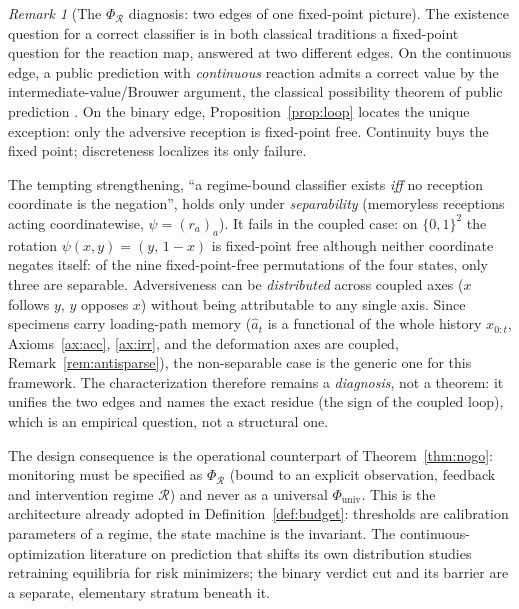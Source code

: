 \documentclass[11pt]{article}
\theoremstyle{plain}
\theoremstyle{definition}
\theoremstyle{remark}
\newtheorem{remark}[theorem]{Remark}
\begin{document}
\begin{remark}[The $\Phi_{\mathcal R}$ diagnosis: two edges of one fixed-point picture]\label{rem:phir}
The existence question for a correct classifier is in both classical traditions a fixed-point question for the reaction map, answered at two different edges. On the continuous edge, a public prediction with \emph{continuous} reaction admits a correct value by the intermediate-value/Brouwer argument, the classical possibility theorem of public prediction \citep{grunbergmodigliani1954,simon1954}. On the binary edge, Proposition~\ref{prop:loop} locates the unique exception: only the adversive reception is fixed-point free. Continuity buys the fixed point; discreteness localizes its only failure.

The tempting strengthening, ``a regime-bound classifier exists \emph{iff} no reception coordinate is the negation'', holds only under \emph{separability} (memoryless receptions acting coordinatewise, $\psi=(r_a)_{a}$). It fails in the coupled case: on $\{0,1\}^2$ the rotation $\psi(x,y)=(y,\,1{-}x)$ is fixed-point free although neither coordinate negates itself: of the nine fixed-point-free permutations of the four states, only three are separable. Adversiveness can be \emph{distributed} across coupled axes ($x$ follows $y$, $y$ opposes $x$) without being attributable to any single axis. Since specimens carry loading-path memory ($\hat a_t$ is a functional of the whole history $x_{0:t}$, Axioms~\ref{ax:acc}, \ref{ax:irr}, and the deformation axes are coupled, Remark~\ref{rem:antisparse}), the non-separable case is the generic one for this framework. The characterization therefore remains a \emph{diagnosis}, not a theorem: it unifies the two edges and names the exact residue (the sign of the coupled loop), which is an empirical question, not a structural one.

The design consequence is the operational counterpart of Theorem~\ref{thm:nogo}: monitoring must be specified as $\Phi_{\mathcal R}$ (bound to an explicit observation, feedback and intervention regime $\mathcal R$) and never as a universal $\Phi_{\mathrm{univ}}$. This is the architecture already adopted in Definition~\ref{def:budget}: thresholds are calibration parameters of a regime, the state machine is the invariant. The continuous-optimization literature on prediction that shifts its own distribution \citep{perdomo2020} studies retraining equilibria for risk minimizers; the binary verdict cut and its barrier are a separate, elementary stratum beneath it.
\end{remark}
\end{document}
